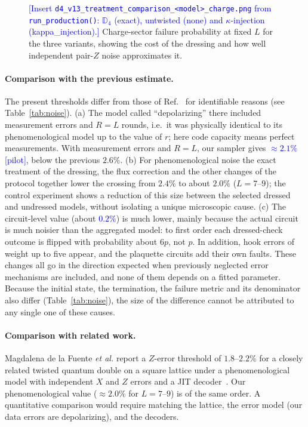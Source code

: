 \documentclass[a4paper]{article}
\newcommand{\blue}[1]{\textcolor{blue}{#1}}
\begin{document}
\begin{figure}[t]
  \centering
  \fbox{\rule{0pt}{50mm}\rule{0.82\linewidth}{0pt}}
  \caption{\blue{[Insert \texttt{d4\_v13\_treatment\_comparison\_<model>\_charge.png} from \texttt{run\_production()}: $\mathbb{D}_4$ (exact), untwisted (none) and $\kappa$-injection (kappa\_injection).]} Charge-sector failure probability at fixed $L$ for the three variants, showing the cost of the dressing and how well independent pair-$Z$ noise approximates it.}
  \label{fig:control}
\end{figure}

\paragraph{Comparison with the previous estimate.}
The present thresholds differ from those of Ref.~\cite{haga2026aqis} for identifiable reasons (see Table~\ref{tab:noise}). (a) The model called ``depolarizing'' there included measurement errors and $R=L$ rounds, i.e.\ it was physically identical to its phenomenological model up to the value of $r$; here code capacity means perfect measurements. With measurement errors and $R=L$, our sampler gives \blue{$\approx2.1\%$ [pilot]}, below the previous $2.6\%$. (b) For phenomenological noise the exact treatment of the dressing, the flux correction and the other changes of the protocol together lower the crossing from $2.4\%$ to about $2.0\%$ ($L=7$--$9$); the control experiment shows a reduction of this size between the selected dressed and undressed models, without isolating a unique microscopic cause. (c) The circuit-level value (about \blue{$0.2\%$}) is much lower, mainly because the actual circuit is much noisier than the aggregated model: to first order each dressed-check outcome is flipped with probability about $6p$, not $p$. In addition, hook errors of weight up to five appear, and the plaquette circuits add their own faults. These changes all go in the direction expected when previously neglected error mechanisms are included, and none of them depends on a fitted parameter. Because the initial state, the termination, the failure metric and its denominator also differ (Table~\ref{tab:noise}), the size of the difference cannot be attributed to any single one of these causes.

\paragraph{Comparison with related work.}
Magdalena de la Fuente \emph{et al.} report a $Z$-error threshold of $1.8$--$2.2\%$ for a closely related twisted quantum double on a square lattice under a phenomenological model with independent $X$ and $Z$ errors and a JIT decoder~\cite{magdalena2026}. Our phenomenological value ($\approx2.0\%$ for $L=7$--$9$) is of the same order. A quantitative comparison would require matching the lattice, the error model (our data errors are depolarizing), and the decoders.
\end{document}
